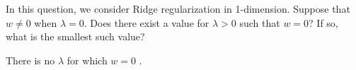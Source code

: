 \subproblem In this question, we consider Ridge regularization in 1-dimension. Suppose that $w \neq 0$ when $\lambda = 0$. Does there exist a value for $\lambda > 0$ such that $w = 0$? If so, what is the smallest such value?

\begin{subsolution}
 There is no $\lambda$ for which $w=0$ .
\end{subsolution}



